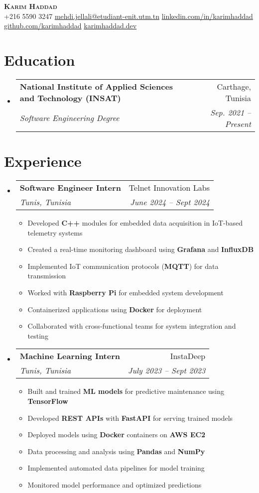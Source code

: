 \documentclass[letterpaper,11pt]{article}
\makeatletter
\newcommand{\resumeItem}[1]{
    \item\small{
            {#1 \vspace{-2pt}}
    }
}
\newcommand{\resumeSubheading}[4]{
    \vspace{-2pt}\item
    \begin{tabular*}{0.97\textwidth}[t]{l@{\extracolsep{\fill}}r}
    \textbf{#1} & #2 \\
    \textit{\small#3} & \textit{\small #4} \\
    \end{tabular*}\vspace{-7pt}
}
\newcommand{\resumeSubItem}[1]{\resumeItem{#1}\vspace{-4pt}}
\newcommand{\resumeSubHeadingListStart}{\begin{itemize}[leftmargin=0.15in, label={}]}
\newcommand{\resumeSubHeadingListEnd}{\end{itemize}}
\newcommand{\resumeItemListStart}{\begin{itemize}}
\newcommand{\resumeItemListEnd}{\end{itemize}\vspace{-5pt}}
\makeatother
\begin{document}
\begin{center}
\textbf{\Huge \scshape Karim Haddad} \\ \vspace{1pt}
\small
+216 5590 3247 \quad
\href{mailto:mehdi.jellali@etudiant-enit.utm.tn}{mehdi.jellali@etudiant-enit.utm.tn} \quad
\href{https://linkedin.com/in/karimhaddad}{linkedin.com/in/karimhaddad} \quad
\href{https://github.com/karimhaddad}{github.com/karimhaddad} \quad
\href{https://karimhaddad.dev}{karimhaddad.dev}
\end{center}

\vspace{20pt}
\section{Education}
\resumeSubHeadingListStart
\resumeSubheading
{National Institute of Applied Sciences and Technology (INSAT)}{Carthage, Tunisia}
{Software Engineering Degree}{Sep. 2021 -- Present}
\resumeSubHeadingListEnd

\section{Experience}
\resumeSubHeadingListStart
\resumeSubheading
{Software Engineer Intern}{Telnet Innovation Labs}{Tunis, Tunisia}
{June 2024 – Sept 2024}
\resumeItemListStart
\resumeItem{Developed \textbf{C++} modules for embedded data acquisition in IoT-based telemetry systems}
\resumeItem{Created a real-time monitoring dashboard using \textbf{Grafana} and \textbf{InfluxDB}}
\resumeItem{Implemented IoT communication protocols (\textbf{MQTT}) for data transmission}
\resumeItem{Worked with \textbf{Raspberry Pi} for embedded system development}
\resumeItem{Containerized applications using \textbf{Docker} for deployment}
\resumeSubItem{Collaborated with cross-functional teams for system integration and testing}
\resumeItemListEnd
\resumeSubheading
{Machine Learning Intern}{InstaDeep}{Tunis, Tunisia}
{July 2023 – Sept 2023}
\resumeItemListStart
\resumeItem{Built and trained \textbf{ML models} for predictive maintenance using \textbf{TensorFlow}}
\resumeItem{Developed \textbf{REST APIs} with \textbf{FastAPI} for serving trained models}
\resumeItem{Deployed models using \textbf{Docker} containers on \textbf{AWS EC2}}
\resumeItem{Data processing and analysis using \textbf{Pandas} and \textbf{NumPy}}
\resumeSubItem{Implemented automated data pipelines for model training}
\resumeSubItem{Monitored model performance and optimized predictions}
\resumeItemListEnd
\resumeSubHeadingListEnd
\end{document}
